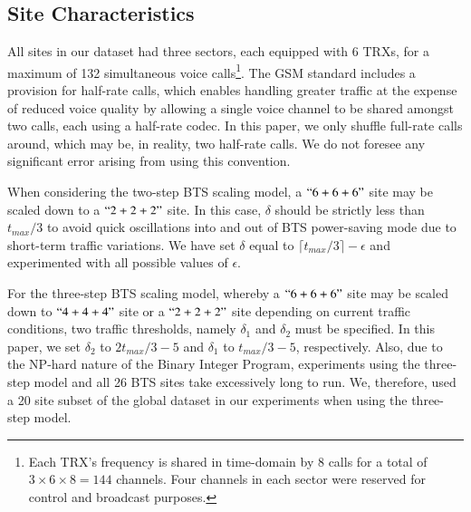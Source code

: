 
\subsection{Site Characteristics}
\label{subsec:sitetypes} All sites in our dataset had three sectors, each equipped with 6 TRXs, for a maximum of %
132 simultaneous voice calls\footnote[1]{Each TRX's frequency is shared in time-domain  by 8 calls for  a total of $3\times6\times8=144$ channels. Four channels in each sector were reserved for control and broadcast purposes.}. The GSM standard includes a provision for half-rate calls, which enables handling greater traffic at the expense of reduced voice quality by allowing a single voice channel to be shared amongst two calls, each using a half-rate codec. In this paper, we only shuffle full-rate calls around, which may be, in reality, two half-rate calls. We do not foresee any significant error arising from using this convention.

When considering the two-step BTS scaling model, a $``6+6+6"$ site may be scaled down to a $``2+2+2"$ site. In this case, $\delta$ should be strictly less than $t_{max}/3$ to avoid quick oscillations into and out of BTS power-saving mode due to short-term traffic variations. %
We have set $\delta$ equal to $\lceil t_{max}/3\rceil - \epsilon$ and experimented with all possible values of $\epsilon$.

For the three-step BTS scaling model, whereby a $``6+6+6"$ site may be scaled down to $``4+4+4"$ site or a $``2+2+2"$ site depending on current traffic conditions, two traffic thresholds, namely $\delta_1$ and $\delta_2$ must be specified. In this paper, we set $\delta_2$ to $2t_{max}/3-5$ and $\delta_1$ to $t_{max}/3-5$, respectively. Also, due to the NP-hard nature of the Binary Integer Program, experiments using the three-step model and all 26 BTS sites take excessively long to run. We, therefore, used a 20 site subset of the global dataset in our experiments when using the three-step model.

